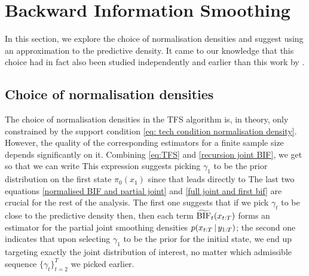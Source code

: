 




\section{Backward Information Smoothing}
In this section, we explore the choice of normalisation densities and suggest using an approximation to the predictive density. It came to our knowledge that this choice had in fact also been studied independently and earlier than this work by \citet{taghavi12}. 

\subsection{Choice of normalisation densities}
The choice of normalisation densities in the TFS algorithm is, in theory, only constrained by the support condition \eqref{eq: tech condition normalisation density}. However, the quality of the corresponding estimators for a finite sample size depends significantly on it. 
Combining \eqref{eq:TFS} and \eqref{recursion joint BIF}, we get
%
%
so that we can write
%
%
This expression suggests picking $\gamma_{1}$ to be the prior distribution on the first state $\pi_{0}(x_{1})$ since that leads directly to 
%
%
The last two equations \eqref{normalised BIF and partial joint} and \eqref{full joint and first bif} are crucial for the rest of the analysis. The first one suggests that if we pick $\gamma_{t}$ to be close to the predictive density then, then each term $\widetilde{\text{BIF}}_{t}(x_{t:T})$ forms an estimator for the partial joint smoothing densities $p(x_{t:T}\,|\, y_{1:T})$; the second one indicates that upon selecting $\gamma_{1}$ to be the prior for the initial state, we end up targeting exactly the joint distribution of interest, no matter which admissible sequence $\{\gamma_{t}\}_{t=2}^{T}$ we picked earlier. 

